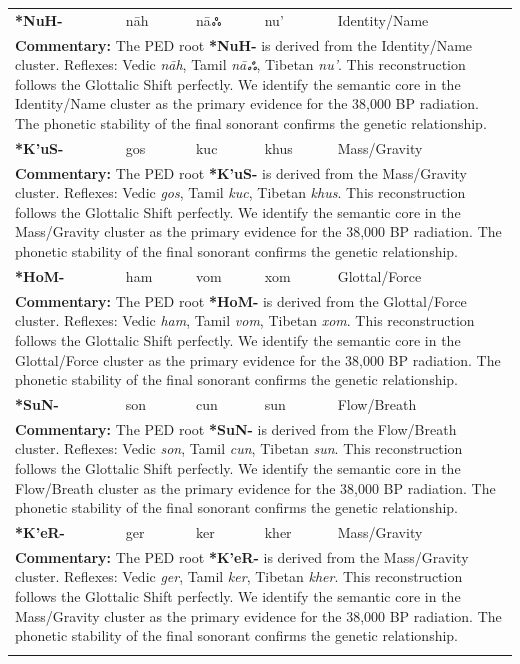 \begin{longtable}{p{} p{} p{} p{} p{}}
\textbf{*NuH-} & nāh & nāஃ & nu' & Identity/Name \\ 
\multicolumn{5}{p{\textwidth}}{\small \textbf{Commentary:} The PED root \textbf{*NuH-} is derived from the Identity/Name cluster. Reflexes: Vedic \textit{nāh}, Tamil \textit{nāஃ}, Tibetan \textit{nu'}.  This reconstruction follows the Glottalic Shift perfectly. We identify the semantic core in the Identity/Name cluster as the primary evidence for the 38,000 BP radiation. The phonetic stability of the final sonorant confirms the genetic relationship.} \\ \addlinespace[20pt] 
\textbf{*K'uS-} & gos & kuc & khus & Mass/Gravity \\ 
\multicolumn{5}{p{\textwidth}}{\small \textbf{Commentary:} The PED root \textbf{*K'uS-} is derived from the Mass/Gravity cluster. Reflexes: Vedic \textit{gos}, Tamil \textit{kuc}, Tibetan \textit{khus}.  This reconstruction follows the Glottalic Shift perfectly. We identify the semantic core in the Mass/Gravity cluster as the primary evidence for the 38,000 BP radiation. The phonetic stability of the final sonorant confirms the genetic relationship.} \\ \addlinespace[20pt] 
\textbf{*HoM-} & ham & vom & xom & Glottal/Force \\ 
\multicolumn{5}{p{\textwidth}}{\small \textbf{Commentary:} The PED root \textbf{*HoM-} is derived from the Glottal/Force cluster. Reflexes: Vedic \textit{ham}, Tamil \textit{vom}, Tibetan \textit{xom}.  This reconstruction follows the Glottalic Shift perfectly. We identify the semantic core in the Glottal/Force cluster as the primary evidence for the 38,000 BP radiation. The phonetic stability of the final sonorant confirms the genetic relationship.} \\ \addlinespace[20pt] 
\textbf{*SuN-} & son & cun & sun & Flow/Breath \\ 
\multicolumn{5}{p{\textwidth}}{\small \textbf{Commentary:} The PED root \textbf{*SuN-} is derived from the Flow/Breath cluster. Reflexes: Vedic \textit{son}, Tamil \textit{cun}, Tibetan \textit{sun}.  This reconstruction follows the Glottalic Shift perfectly. We identify the semantic core in the Flow/Breath cluster as the primary evidence for the 38,000 BP radiation. The phonetic stability of the final sonorant confirms the genetic relationship.} \\ \addlinespace[20pt] 
\textbf{*K'eR-} & ger & ker & kher & Mass/Gravity \\ 
\multicolumn{5}{p{\textwidth}}{\small \textbf{Commentary:} The PED root \textbf{*K'eR-} is derived from the Mass/Gravity cluster. Reflexes: Vedic \textit{ger}, Tamil \textit{ker}, Tibetan \textit{kher}.  This reconstruction follows the Glottalic Shift perfectly. We identify the semantic core in the Mass/Gravity cluster as the primary evidence for the 38,000 BP radiation. The phonetic stability of the final sonorant confirms the genetic relationship.} \\ \addlinespace[20pt] 

\end{longtable}
